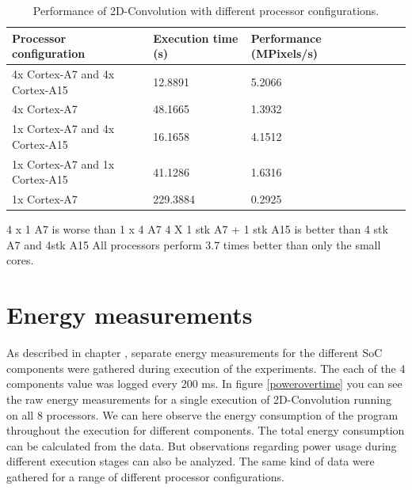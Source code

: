 \begin{table}[H]
  \begin{tabular}{llllll}
    \toprule
    Processor configuration           & Execution time (s)  & Performance (MPixels/s) \\
    \midrule
    4x Cortex-A7 and 4x Cortex-A15    & 12.8891             & 5.2066\\
    4x Cortex-A7                      & 48.1665             & 1.3932\\
    1x Cortex-A7 and 4x Cortex-A15    & 16.1658             & 4.1512\\
    1x Cortex-A7 and 1x Cortex-A15    & 41.1286             & 1.6316\\
    1x Cortex-A7                      & 229.3884            & 0.2925\\
    \bottomrule
  \end{tabular}
  \caption{Performance of 2D-Convolution with different processor configurations. \label{overflow}}
\end{table}


4 x 1 A7 is worse than 1 x 4 A7
4 X 1 stk A7 + 1 stk A15 is better than 4 stk A7 and 4stk A15
All processors perform 3.7 times better than only the small cores.

\section{Energy measurements}
As described in chapter , separate energy measurements for the different SoC components were gathered during execution of the experiments.
The each of the 4 components value was logged every 200 ms.
In figure \ref{powerovertime} you can see the raw energy measurements for a single execution of 2D-Convolution running on all 8 processors.
We can here observe the energy consumption of the program throughout the execution for different components.
The total energy consumption can be calculated from the data.
But observations regarding power usage during different execution stages can also be analyzed.
The same kind of data were gathered for a range of different processor configurations.

